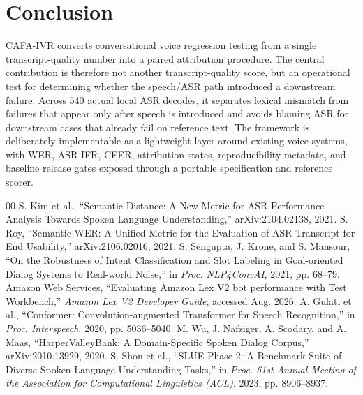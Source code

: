 \documentclass[9pt,twocolumn]{extarticle}
\begin{document}
\section{Conclusion}
CAFA-IVR converts conversational voice regression testing from a single transcript-quality number into a paired attribution procedure. The central contribution is therefore not another transcript-quality score, but an operational test for determining whether the speech/ASR path introduced a downstream failure. Across 540 actual local ASR decodes, it separates lexical mismatch from failures that appear only after speech is introduced and avoids blaming ASR for downstream cases that already fail on reference text. The framework is deliberately implementable as a lightweight layer around existing voice systems, with WER, ASR-IFR, CEER, attribution states, reproducibility metadata, and baseline release gates exposed through a portable specification and reference scorer.

\begin{thebibliography}{00}
 S. Kim et al., ``Semantic Distance: A New Metric for ASR Performance Analysis Towards Spoken Language Understanding,'' arXiv:2104.02138, 2021.
 S. Roy, ``Semantic-WER: A Unified Metric for the Evaluation of ASR Transcript for End Usability,'' arXiv:2106.02016, 2021.
 S. Sengupta, J. Krone, and S. Mansour, ``On the Robustness of Intent Classification and Slot Labeling in Goal-oriented Dialog Systems to Real-world Noise,'' in \emph{Proc. NLP4ConvAI}, 2021, pp. 68--79.
 Amazon Web Services, ``Evaluating Amazon Lex V2 bot performance with Test Workbench,'' \emph{Amazon Lex V2 Developer Guide}, accessed Aug. 2026.
 A. Gulati et al., ``Conformer: Convolution-augmented Transformer for Speech Recognition,'' in \emph{Proc. Interspeech}, 2020, pp. 5036--5040.
 M. Wu, J. Nafziger, A. Scodary, and A. Maas, ``HarperValleyBank: A Domain-Specific Spoken Dialog Corpus,'' arXiv:2010.13929, 2020.
 S. Shon et al., ``SLUE Phase-2: A Benchmark Suite of Diverse Spoken Language Understanding Tasks,'' in \emph{Proc. 61st Annual Meeting of the Association for Computational Linguistics (ACL)}, 2023, pp. 8906--8937.
\end{thebibliography}
\end{document}
